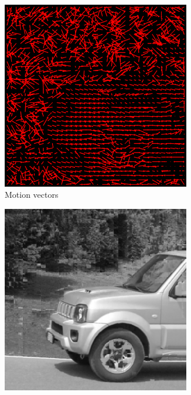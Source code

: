 \documentclass{homework}
\begin{document}
\begin{figure}[H]
    \centering
    \begin{subfigure}{0.32\textwidth}
        \centering
        \includegraphics[width=0.9\textwidth]{8_16_motion_vectors.png}
        \caption{Motion vectors}
    \end{subfigure}
    \begin{subfigure}{0.32\textwidth}
        \centering
        \includegraphics[width=0.9\textwidth]{8_16_motion_compensation.png}

\end{subfigure}
\end{figure}
\end{document}
